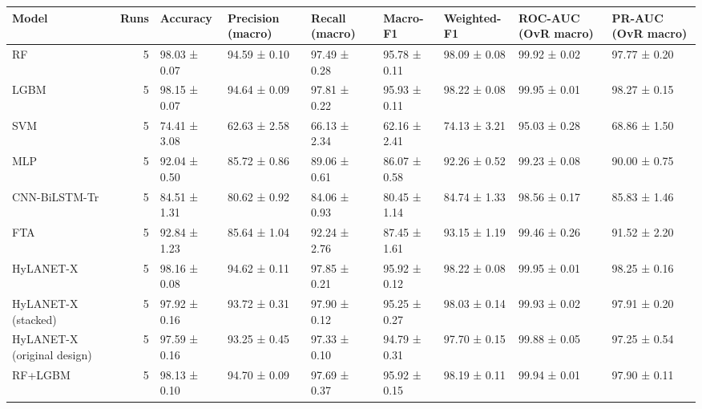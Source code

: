 \begin{tabular}{lrlllllll}
\toprule
Model & Runs & Accuracy & Precision (macro) & Recall (macro) & Macro-F1 & Weighted-F1 & ROC-AUC (OvR macro) & PR-AUC (OvR macro) \\
\midrule
RF & 5 & 98.03 ± 0.07 & 94.59 ± 0.10 & 97.49 ± 0.28 & 95.78 ± 0.11 & 98.09 ± 0.08 & 99.92 ± 0.02 & 97.77 ± 0.20 \\
LGBM & 5 & 98.15 ± 0.07 & 94.64 ± 0.09 & 97.81 ± 0.22 & 95.93 ± 0.11 & 98.22 ± 0.08 & 99.95 ± 0.01 & 98.27 ± 0.15 \\
SVM & 5 & 74.41 ± 3.08 & 62.63 ± 2.58 & 66.13 ± 2.34 & 62.16 ± 2.41 & 74.13 ± 3.21 & 95.03 ± 0.28 & 68.86 ± 1.50 \\
MLP & 5 & 92.04 ± 0.50 & 85.72 ± 0.86 & 89.06 ± 0.61 & 86.07 ± 0.58 & 92.26 ± 0.52 & 99.23 ± 0.08 & 90.00 ± 0.75 \\
CNN-BiLSTM-Tr & 5 & 84.51 ± 1.31 & 80.62 ± 0.92 & 84.06 ± 0.93 & 80.45 ± 1.14 & 84.74 ± 1.33 & 98.56 ± 0.17 & 85.83 ± 1.46 \\
FTA & 5 & 92.84 ± 1.23 & 85.64 ± 1.04 & 92.24 ± 2.76 & 87.45 ± 1.61 & 93.15 ± 1.19 & 99.46 ± 0.26 & 91.52 ± 2.20 \\
HyLANET-X & 5 & 98.16 ± 0.08 & 94.62 ± 0.11 & 97.85 ± 0.21 & 95.92 ± 0.12 & 98.22 ± 0.08 & 99.95 ± 0.01 & 98.25 ± 0.16 \\
HyLANET-X (stacked) & 5 & 97.92 ± 0.16 & 93.72 ± 0.31 & 97.90 ± 0.12 & 95.25 ± 0.27 & 98.03 ± 0.14 & 99.93 ± 0.02 & 97.91 ± 0.20 \\
HyLANET-X (original design) & 5 & 97.59 ± 0.16 & 93.25 ± 0.45 & 97.33 ± 0.10 & 94.79 ± 0.31 & 97.70 ± 0.15 & 99.88 ± 0.05 & 97.25 ± 0.54 \\
RF+LGBM & 5 & 98.13 ± 0.10 & 94.70 ± 0.09 & 97.69 ± 0.37 & 95.92 ± 0.15 & 98.19 ± 0.11 & 99.94 ± 0.01 & 97.90 ± 0.11 \\
\bottomrule
\end{tabular}
